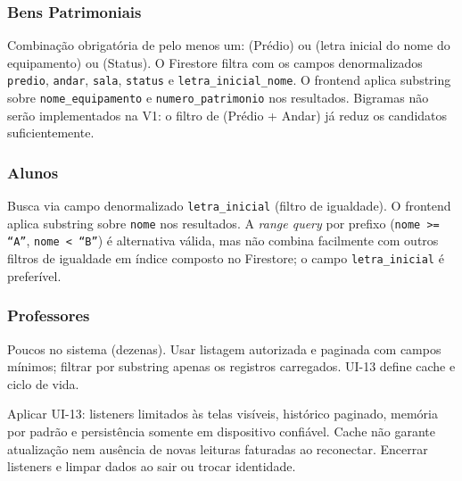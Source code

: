 \subsubsection{Bens Patrimoniais}
Combinação obrigatória de pelo menos um: (Prédio) ou (letra inicial do nome do equipamento) ou (Status). O Firestore filtra com os campos denormalizados \texttt{predio}, \texttt{andar}, \texttt{sala}, \texttt{status} e \texttt{letra\_inicial\_nome}. O frontend aplica substring sobre \texttt{nome\_equipamento} e \texttt{numero\_patrimonio} nos resultados. Bigramas não serão implementados na V1: o filtro de (Prédio + Andar) já reduz os candidatos suficientemente.

\subsubsection{Alunos}
Busca via campo denormalizado \texttt{letra\_inicial} (filtro de igualdade). O frontend aplica substring sobre \texttt{nome} nos resultados. A \textit{range query} por prefixo (\texttt{nome >= ``A''}, \texttt{nome < ``B''}) é alternativa válida, mas não combina facilmente com outros filtros de igualdade em índice composto no Firestore; o campo \texttt{letra\_inicial} é preferível.

\subsubsection{Professores}
Poucos no sistema (dezenas). Usar listagem autorizada e paginada com campos mínimos; filtrar por substring apenas os registros carregados. UI-13 define cache e ciclo de vida.

\begin{regra}
Aplicar UI-13: listeners limitados às telas visíveis, histórico paginado, memória por padrão e persistência somente em dispositivo confiável. Cache não garante atualização nem ausência de novas leituras faturadas ao reconectar. Encerrar listeners e limpar dados ao sair ou trocar identidade.
\end{regra}

